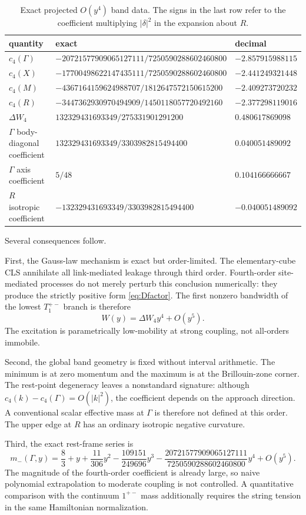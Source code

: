 \documentclass[11pt]{article}
\begin{document}
\begin{table}[ht]
\centering
\scriptsize
\begin{tabular}{lll}
\toprule
quantity & exact & decimal \\
\midrule
$c_4(\Gamma)$ &
$-20721577909065127111/7250590288602460800$ & $-2.857915988115$ \\
$c_4(X)$ &
$-17700498622147435111/7250590288602460800$ & $-2.441249321448$ \\
$c_4(M)$ &
$-4367164159624988707/1812647572150615200$ & $-2.409273720232$ \\
$c_4(R)$ &
$-3447362930970494909/1450118057720492160$ & $-2.377298119016$ \\
$\Delta W_4$ &
$132329431693349/275331901291200$ & $0.480617869098$ \\
$\Gamma$ body-diagonal coefficient &
$132329431693349/3303982815494400$ & $0.040051489092$ \\
$\Gamma$ axis coefficient & $5/48$ & $0.104166666667$ \\
$R$ isotropic coefficient &
$-132329431693349/3303982815494400$ & $-0.040051489092$ \\
\bottomrule
\end{tabular}
\caption{Exact projected $O(y^4)$ band data. The signs in the last row refer
to the coefficient multiplying $|\delta|^2$ in the expansion about $R$.}
\label{tab:y4band}
\end{table}

Several consequences follow.

First, the Gauss-law mechanism is exact but order-limited. The elementary-cube
CLS annihilate all link-mediated leakage through third order. Fourth-order
site-mediated processes do not merely perturb this conclusion numerically:
they produce the strictly positive form \eqref{eq:Dfactor}. The first
nonzero bandwidth of the lowest $T_1^{+-}$ branch is therefore
\[
W(y)=\Delta W_4y^4+O(y^5).
\]
The excitation is parametrically low-mobility at strong coupling, not
all-orders immobile.

Second, the global band geometry is fixed without interval arithmetic. The
minimum is at zero momentum and the maximum is at the Brillouin-zone corner.
The rest-point degeneracy leaves a nonstandard signature: although
$c_4(k)-c_4(\Gamma)=O(|k|^2)$, the coefficient depends on the approach
direction. A conventional scalar effective mass at $\Gamma$ is therefore
not defined at this order. The upper edge at $R$ has an ordinary isotropic
negative curvature.

Third, the exact rest-frame series is
\begin{equation}
m_-(\Gamma,y)=\frac83+y+\frac{11}{306}y^2
-\frac{109151}{249696}y^3
-\frac{20721577909065127111}{7250590288602460800}y^4+O(y^5).
\label{eq:restseries4}
\end{equation}
The magnitude of the fourth-order coefficient is already large, so naive
polynomial extrapolation to moderate coupling is not controlled. A
quantitative comparison with the continuum $1^{+-}$ mass additionally
requires the string tension in the same Hamiltonian normalization.
\end{document}
